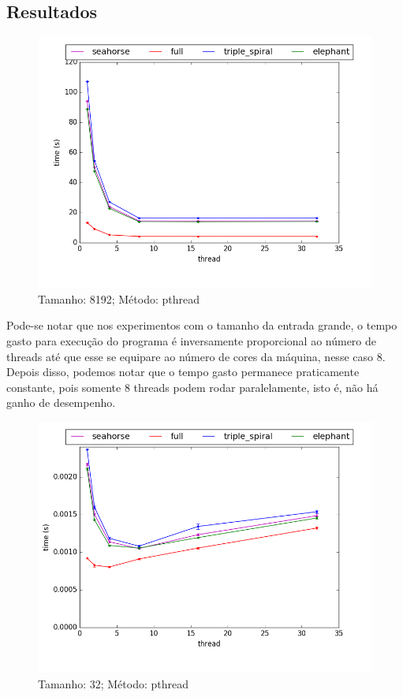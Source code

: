 \documentclass[final,12pt,a4paper]{elsarticle}
\begin{document}
\subsection{Resultados}

\begin{figure}[htpb]
    \centering
    \includegraphics[width=.9\textwidth]{image4}
    \caption{Tamanho: 8192; Método: pthread}
    \label{fig:image4}
\end{figure}

Pode-se notar que nos experimentos com o tamanho da entrada grande, o tempo gasto para execução do programa é inversamente proporcional ao número de threads até que esse se equipare ao número de cores da máquina, nesse caso 8. Depois disso, podemos notar que o tempo gasto permanece praticamente constante, pois somente 8 threads podem rodar paralelamente, isto é, não há ganho de desempenho.

\clearpage
\begin{figure}[htpb]
    \centering
    \includegraphics[width=.9\textwidth]{image5}
    \caption{Tamanho: 32; Método: pthread}
    \label{fig:image5}
\end{figure} 
\end{document}
